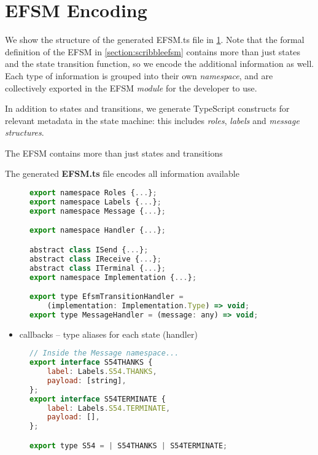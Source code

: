 \section{EFSM Encoding}
\label{section:nodeefsm}

We show the structure of the generated EFSM.ts file in
\cref{lst:nodeefsmfile}.
Note that the formal definition of the EFSM in 
\cref{section:scribbleefsm}
contains more than just states and the state transition function,
so we encode the additional information as well.
Each type of information is grouped into their own
\textit{namespace}, and are collectively exported in
the EFSM \textit{module} for the developer to use.

In addition to states and transitions, we generate 
TypeScript constructs
for relevant metadata in the state machine: this includes
\textit{roles}, \textit{labels} and \textit{message structures}.


The EFSM contains more than just states and transitions

The generated \textbf{EFSM.ts} file encodes all information
available 

\begin{figure}
\begin{lstlisting}[language=javascript,tabsize=2]
export namespace Roles {...};
export namespace Labels {...};
export namespace Message {...};

export namespace Handler {...};

abstract class ISend {...};
abstract class IReceive {...};
abstract class ITerminal {...};
export namespace Implementation {...};

export type EfsmTransitionHandler =
	(implementation: Implementation.Type) => void;
export type MessageHandler = (message: any) => void;
\end{lstlisting}
\label{lst:nodeefsmfile}
\end{figure}

\begin{itemize}
\item callbacks -- type aliases for each state (handler)
\end{itemize}

\begin{figure}[!ht]
\begin{lstlisting}[language=javascript, tabsize=2]
// Inside the Message namespace...
export interface S54THANKS {
	label: Labels.S54.THANKS,
	payload: [string],
};
export interface S54TERMINATE {
	label: Labels.S54.TERMINATE,
	payload: [],
};

export type S54 = | S54THANKS | S54TERMINATE;
\end{lstlisting}
\label{lst:addersvrmsg}
\end{figure}

